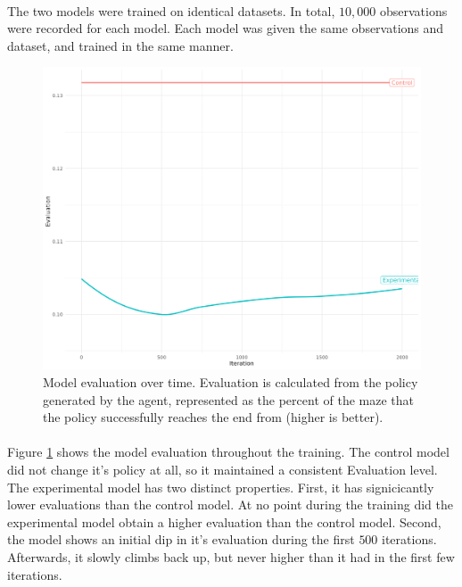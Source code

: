 \documentclass[12pt]{article}
\begin{document}
\paragraph{} 
The two models were trained on identical datasets.
In total, $10,000$ observations were recorded for each model. 
Each model was given the same observations and dataset, and trained in the same manner.

\begin{figure}[h]
    \includegraphics[width=\linewidth]{graph.png}
    \caption{Model evaluation over time. Evaluation is calculated from the policy generated by the agent, represented as the percent of the maze that the policy successfully reaches the end from (higher is better).}
		\label{fig:graphs}
\end{figure}

\paragraph{}
Figure \ref{fig:graphs} shows the model evaluation throughout the training.
The control model did not change it's policy at all, so it maintained a consistent Evaluation level.
The experimental model has two distinct properties.
First, it has signicicantly lower evaluations than the control model.
At no point during the training did the experimental model obtain a higher evaluation than the control model.
Second, the model shows an initial dip in it's evaluation during the first $500$ iterations.
Afterwards, it slowly climbs back up, but never higher than it had in the first few iterations.




\newpage


\end{document}
